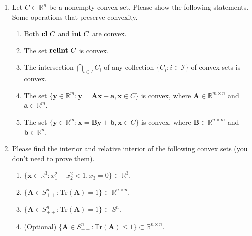 \documentclass[11pt,letter,notitlepage]{article}
\DeclareMathOperator*{\relint}{\bf relint\,}
\DeclareMathOperator*{\intp}{\bf int\,}
\DeclareMathOperator*{\cl}{\bf cl\,}
\DeclareMathOperator*{\conv}{\bf conv\,}
\begin{document}
\newpage

\begin{exercise}
    \begin{enumerate}
        \item  Let $C \subset \mathbb{R}^n$ be a nonempty convex set. Please show the following statements. Some operations that preserve convexity.
          \begin{enumerate}
            \item
            Both $\cl C $ and $\intp C $ are convex.
            \item
            The set $\relint{C}$ is convex.
            \item
            The intersection $\bigcap_{i \in I}C_i$ of any collection $\{ C_i:i\in \mathcal{I} \}$ of convex sets is convex.
    
            \item
            The set $\{ \mathbf{y}\in\mathbb{R}^m:\mathbf{y}=\mathbf{Ax}+\mathbf{a},\mathbf{x}\in C \}$ is convex, where $\mathbf{A} \in \mathbb{R}^{m \times n}$ and $\mathbf{a} \in \mathbb{R}^m$.
            \item
            The set $\{ \mathbf{y}\in\mathbb{R}^m:\mathbf{x}=\mathbf{By}+\mathbf{b},\mathbf{x}\in C \}$ is convex, where $\mathbf{B} \in \mathbb{R}^{n \times m}$ and $\mathbf{b} \in \mathbb{R}^n$.
        \end{enumerate}
        \item Please find the interior and relative interior of the following convex sets (you don't need to prove them).
        \begin{enumerate}
          \item $\{\mathbf{x}\in\mathbb{R}^3: x_1^2+x_2^2<1,x_3=0\}\subset\mathbb{R}^3$.
          \item $\{\mathbf{A}\in S_{++}^n: \text{Tr}(\mathbf{A})=1\}\subset \mathbb{R}^{n\times n}$.
          \item $\{\mathbf{A}\in S_{++}^n: \text{Tr}(\mathbf{A})=1\}\subset S^ n$.
          \item (Optional) $\{\mathbf{A}\in S_{++}^n: \text{Tr}(\mathbf{A})\le1\}\subset \mathbb{R}^{n\times n}$.
        \end{enumerate}

    \end{enumerate}

\end{exercise}
\begin{solution}

\end{solution}
\end{document}
